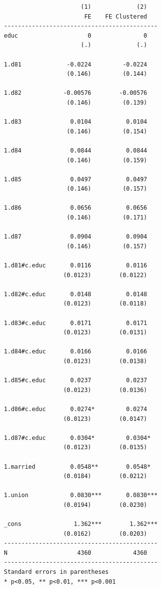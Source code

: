 \documentclass[
]{book}
\begin{document}
\begin{verbatim}
                      (1)             (2)   
                       FE    FE Clustered   
--------------------------------------------
educ                    0               0   
                      (.)             (.)   

1.d81             -0.0224         -0.0224   
                  (0.146)         (0.144)   

1.d82            -0.00576        -0.00576   
                  (0.146)         (0.139)   

1.d83              0.0104          0.0104   
                  (0.146)         (0.154)   

1.d84              0.0844          0.0844   
                  (0.146)         (0.159)   

1.d85              0.0497          0.0497   
                  (0.146)         (0.157)   

1.d86              0.0656          0.0656   
                  (0.146)         (0.171)   

1.d87              0.0904          0.0904   
                  (0.146)         (0.157)   

1.d81#c.educ       0.0116          0.0116   
                 (0.0123)        (0.0122)   

1.d82#c.educ       0.0148          0.0148   
                 (0.0123)        (0.0118)   

1.d83#c.educ       0.0171          0.0171   
                 (0.0123)        (0.0131)   

1.d84#c.educ       0.0166          0.0166   
                 (0.0123)        (0.0138)   

1.d85#c.educ       0.0237          0.0237   
                 (0.0123)        (0.0136)   

1.d86#c.educ       0.0274*         0.0274   
                 (0.0123)        (0.0147)   

1.d87#c.educ       0.0304*         0.0304*  
                 (0.0123)        (0.0135)   

1.married          0.0548**        0.0548*  
                 (0.0184)        (0.0212)   

1.union            0.0830***       0.0830***
                 (0.0194)        (0.0230)   

_cons               1.362***        1.362***
                 (0.0162)        (0.0203)   
--------------------------------------------
N                    4360            4360   
--------------------------------------------
Standard errors in parentheses
* p<0.05, ** p<0.01, *** p<0.001
\end{verbatim}
\end{document}
